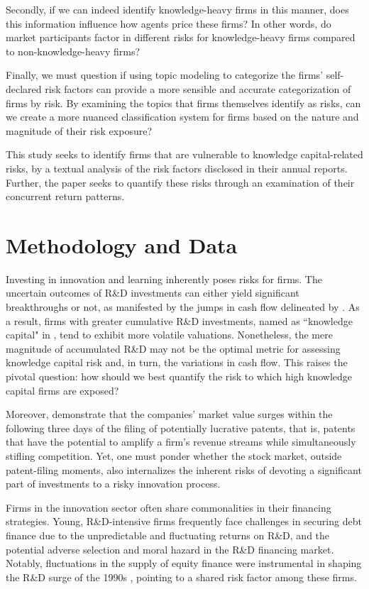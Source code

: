 \documentclass[12pt, letterpaper]{article}
\begin{document}
Secondly, if we can indeed identify knowledge-heavy firms in this manner, does this information influence how agents price these firms? In other words, do market participants factor in different risks for knowledge-heavy firms compared to non-knowledge-heavy firms?

Finally, we must question if using topic modeling to categorize the firms' self-declared risk factors can provide a more sensible and accurate categorization of firms by risk. By examining the topics that firms themselves identify as risks, can we create a more nuanced classification system for firms based on the nature and magnitude of their risk exposure?

This study seeks to identify firms that are vulnerable to knowledge capital-related risks, by a textual analysis of the risk factors disclosed in their annual reports. Further, the paper seeks to quantify these risks through an examination of their concurrent return patterns.

\section{Methodology and Data}

Investing in innovation and learning inherently poses risks for firms. The uncertain outcomes of R\&D investments can either yield significant breakthroughs or not, as manifested by the jumps in cash flow delineated by \citet{Andrei2019-bh}. As a result, firms with greater cumulative R\&D investments, named as ``knowledge capital" in \cite{Belo2019-iz}, tend to exhibit more volatile valuations. Nonetheless, the mere magnitude of accumulated R\&D may not be the optimal metric for assessing knowledge capital risk and, in turn, the variations in cash flow. This raises the pivotal question: how should we best quantify the risk to which high knowledge capital firms are exposed?

Moreover, \citet{Kogan2017-fx} demonstrate that the companies' market value  surges within the following three days of the filing of potentially lucrative patents, that is, patents that have the potential to amplify a firm's revenue streams while simultaneously stifling competition. Yet, one must ponder whether the stock market, outside patent-filing moments, also internalizes the inherent risks of devoting a significant part of investments to a risky innovation process.

Firms in the innovation sector often share commonalities in their financing strategies. Young, R\&D-intensive firms frequently face challenges in securing debt finance due to the unpredictable and fluctuating returns on R\&D, and the potential adverse selection and moral hazard in the R\&D financing market. Notably, fluctuations in the supply of equity finance were instrumental in shaping the R\&D surge of the 1990s \citep{Brown2009-zp}, pointing to a shared risk factor among these firms.
\end{document}
